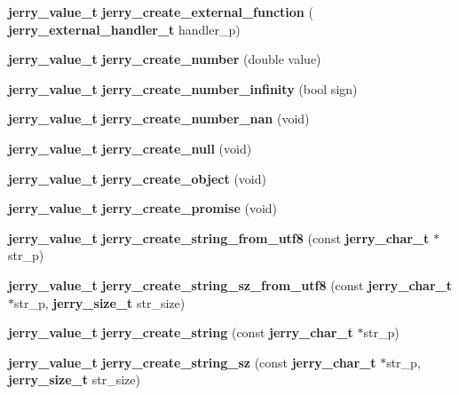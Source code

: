 \begin{DoxyCompactItemize}
\mbox{\label{group___core_ga1e4e81dff70317738f785d4f95cc3847}} 
\textbf{ jerry\+\_\+value\+\_\+t} {\bfseries jerry\+\_\+create\+\_\+external\+\_\+function} (\textbf{ jerry\+\_\+external\+\_\+handler\+\_\+t} handler\+\_\+p)
\item 
\mbox{\label{group___core_gad57a0d7238f5dfa0f02d030fc48dee92}} 
\textbf{ jerry\+\_\+value\+\_\+t} {\bfseries jerry\+\_\+create\+\_\+number} (double value)
\item 
\mbox{\label{group___core_ga2fbf77c7e08b2042f7a7c530056685f0}} 
\textbf{ jerry\+\_\+value\+\_\+t} {\bfseries jerry\+\_\+create\+\_\+number\+\_\+infinity} (bool sign)
\item 
\mbox{\label{group___core_ga422e0a4b60b8c583b422715aeefc5816}} 
\textbf{ jerry\+\_\+value\+\_\+t} {\bfseries jerry\+\_\+create\+\_\+number\+\_\+nan} (void)
\item 
\mbox{\label{group___core_ga262e3f781184758db7d7f496161ea6f3}} 
\textbf{ jerry\+\_\+value\+\_\+t} {\bfseries jerry\+\_\+create\+\_\+null} (void)
\item 
\mbox{\label{group___core_gae68dc7e5ee5b2c754a3b1d486bc5b8fd}} 
\textbf{ jerry\+\_\+value\+\_\+t} {\bfseries jerry\+\_\+create\+\_\+object} (void)
\item 
\mbox{\label{group___core_ga25da41add859edccb4f47503e0a31433}} 
\textbf{ jerry\+\_\+value\+\_\+t} {\bfseries jerry\+\_\+create\+\_\+promise} (void)
\item 
\mbox{\label{group___core_gab1a41f27255b8e6f56748b37a5f5b3bc}} 
\textbf{ jerry\+\_\+value\+\_\+t} {\bfseries jerry\+\_\+create\+\_\+string\+\_\+from\+\_\+utf8} (const \textbf{ jerry\+\_\+char\+\_\+t} $\ast$str\+\_\+p)
\item 
\mbox{\label{group___core_ga073e97cb71dba70ccddcb0c075fa155b}} 
\textbf{ jerry\+\_\+value\+\_\+t} {\bfseries jerry\+\_\+create\+\_\+string\+\_\+sz\+\_\+from\+\_\+utf8} (const \textbf{ jerry\+\_\+char\+\_\+t} $\ast$str\+\_\+p, \textbf{ jerry\+\_\+size\+\_\+t} str\+\_\+size)
\item 
\mbox{\label{group___core_ga609d45ad835f50496eb2e719355d2f94}} 
\textbf{ jerry\+\_\+value\+\_\+t} {\bfseries jerry\+\_\+create\+\_\+string} (const \textbf{ jerry\+\_\+char\+\_\+t} $\ast$str\+\_\+p)
\item 
\mbox{\label{group___core_gab5e64d7ea8840064f01a56a9e7cc7069}} 
\textbf{ jerry\+\_\+value\+\_\+t} {\bfseries jerry\+\_\+create\+\_\+string\+\_\+sz} (const \textbf{ jerry\+\_\+char\+\_\+t} $\ast$str\+\_\+p, \textbf{ jerry\+\_\+size\+\_\+t} str\+\_\+size)
\item 

\end{DoxyCompactItemize}
